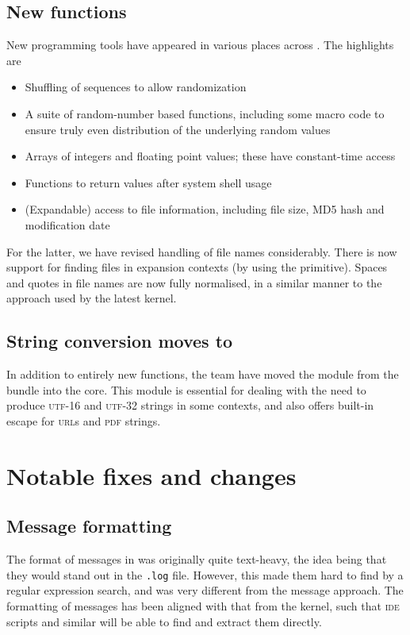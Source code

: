 \documentclass{ltnews}
\begin{document}
\subsection{New functions}

New programming tools have appeared in various places across .
The highlights are
\begin{itemize}
  \item Shuffling of sequences to allow randomization
  \item A suite of random-number based functions, including some macro code
    to ensure truly even distribution of the underlying random values
  \item Arrays of integers and floating point values; these have constant-time
    access
  \item Functions to return values after system shell usage
  \item (Expandable) access to file information, including file size, MD5
    hash and modification date
\end{itemize}

For the latter, we have revised handling of file names considerably. There is
now support for finding files in expansion contexts (by using the
 primitive). Spaces and quotes in file names are now fully
normalised, in a similar manner to the approach used by the latest \LaTeXe{}
kernel.

\subsection{String conversion moves to }

In addition to entirely new functions, the team have moved the
 module from the  bundle into the
 core. This module is essential for dealing with the need to produce
\textsc{utf}-16 and \textsc{utf}-32 strings in some contexts, and also offers
built-in escape for \textsc{url}s and \textsc{pdf} strings.

\section{Notable fixes and changes}

\subsection{Message formatting}

The format of messages in  was originally quite text-heavy, the idea
being that they would stand out in the \texttt{.log} file. However, this made
them hard to find by a regular expression search, and was very different from
the \LaTeXe{} message approach. The formatting of  messages has been
aligned with that from the \LaTeXe{} kernel, such that \textsc{ide} scripts and
similar will be able to find and extract them directly.
\end{document}

